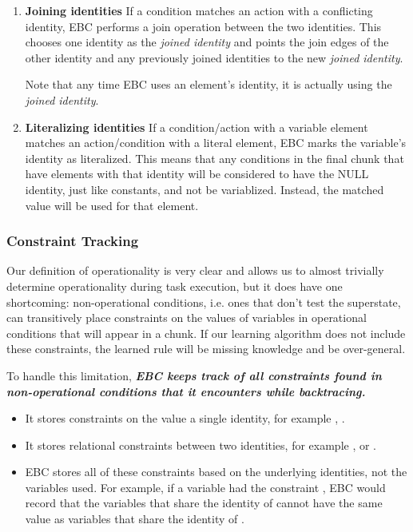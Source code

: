 \begin{enumerate}
	\item \textbf{Joining identities} \hfill
	If a condition matches an action with a conflicting identity, EBC performs a join operation between the two identities. This chooses one identity as the \textit{joined identity} and points the join edges of the other identity and any previously joined identities to the new \textit{joined identity}.

	Note that any time EBC uses an element's identity, it is actually using the \textit{joined identity}.
	
	\item \textbf{Literalizing identities} \hfill
	If a condition/action with a variable element matches an action/condition with a literal element, EBC marks the variable's identity as literalized.  This means that any conditions in the final chunk that have elements with that identity will be considered to have the NULL identity, just like constants, and not be variablized.  Instead, the matched value will be used for that element.
\end{enumerate}


\subsubsection{Constraint Tracking}

Our definition of operationality is very clear and allows us to almost trivially determine operationality during task execution, but it does have one shortcoming: non-operational conditions, i.e. ones that don't test the superstate, can transitively place constraints on the values of variables in operational conditions that will appear in a chunk.  If our learning algorithm does not include these constraints, the learned rule will be missing knowledge and be over-general.

To handle this limitation, \textbf{\textit{EBC keeps track of all constraints found in non-operational conditions that it encounters while backtracing.}}

\begin{itemize}
	\item It stores constraints on the value a single identity, for example , .
	\item It stores relational constraints between two identities, for example ,   or  .  
	\item EBC stores all of these constraints based on the underlying identities, not the variables used.  For example, if a variable  had the constraint , EBC would record that the variables that share the identity of  cannot have the same value as variables that share the identity of .
\end{itemize}

